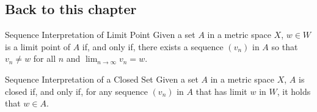 \subsection{Back to this chapter}

\begin{thm}{Sequence Interpretation of Limit Point}{}
	Given a set \(A\) in a metric space \(X\), \(w \in W\) is a limit point of \(A\) if, and only if, there exists a sequence \((v_n)\) in \(A\) so that \(v_n \neq w\) for all \(n\) and \(\lim_{n\to\infty} v_n = w\).
\end{thm}

\begin{thm}{Sequence Interpretation of a Closed Set}{}
	Given a set \(A\) in a metric space \(X\), \(A\) is closed if, and only if, for any sequence \((v_n)\) in \(A\) that has limit \(w\) in \(W\), it holds that \(w \in A\).
\end{thm}

